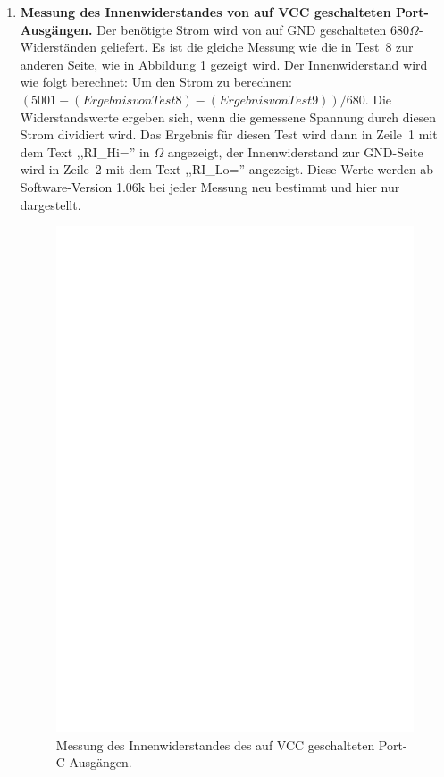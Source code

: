 \begin{enumerate}
\item {\bf Messung des Innenwiderstandes von auf VCC geschalteten Port-Ausgängen.}
Der benötigte Strom wird von auf GND geschalteten \(680\Omega\)-Widerständen geliefert.
Es ist die gleiche Messung wie die in Test~8 zur anderen Seite, wie in Abbildung \ref{fig:test8} gezeigt wird.
Der Innenwiderstand wird wie folgt berechnet:
Um den Strom zu berechnen: \((5001 - (Ergebnis von Test 8) - (Ergebnis von Test 9)) / 680\).
Die Widerstandswerte ergeben sich, wenn die gemessene Spannung durch diesen Strom dividiert wird.
Das Ergebnis für diesen Test wird dann in Zeile~1 mit dem Text ,,RI\_Hi='' in \(\Omega\) angezeigt, der Innenwiderstand
zur GND-Seite wird in Zeile~2 mit dem Text ,,RI\_Lo='' angezeigt.
Diese Werte werden ab Software-Version 1.06k bei jeder Messung neu bestimmt und hier nur dargestellt.
\begin{figure}[H]
\centering
\includegraphics[]{../FIG/Test8.eps}
\caption{Messung des Innenwiderstandes des auf VCC geschalteten Port-C-Ausgängen.}
\label{fig:test8}
\end{figure}


\end{enumerate}
